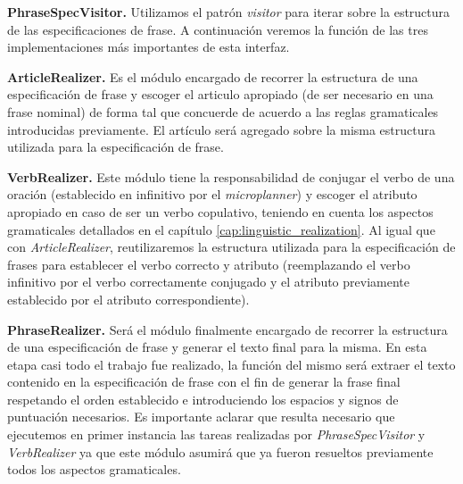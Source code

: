 \bigskip
\noindent
\textbf{PhraseSpecVisitor.} Utilizamos el patrón \textit{visitor} \cite{gof} para iterar sobre la estructura de las especificaciones de frase. A continuación veremos la función de las tres implementaciones más importantes de esta interfaz. 

\bigskip
\noindent
\textbf{ArticleRealizer.} Es el módulo encargado de recorrer la estructura de una especificación de frase y escoger el articulo apropiado (de ser necesario en una frase nominal) de forma tal que concuerde de acuerdo a las reglas gramaticales introducidas previamente. El artículo será agregado sobre la misma estructura utilizada para la especificación de frase.

\bigskip
\noindent
\textbf{VerbRealizer.} Este módulo tiene la responsabilidad de conjugar el verbo de una oración (establecido en infinitivo por el \textit{microplanner}) y escoger el atributo apropiado en caso de ser un verbo copulativo, teniendo en cuenta los aspectos gramaticales detallados en el capítulo \ref{cap:linguistic_realization}. Al igual que con \textit{ArticleRealizer}, reutilizaremos la estructura utilizada para la especificación de frases para establecer el verbo correcto y atributo (reemplazando el verbo infinitivo por el verbo correctamente conjugado y el atributo previamente establecido por el atributo correspondiente).

\bigskip
\noindent
\textbf{PhraseRealizer.} Será el módulo finalmente encargado de recorrer la estructura de una especificación de frase y generar el texto final para la misma. En esta etapa casi todo el trabajo fue realizado, la función del mismo será extraer el texto contenido en la especificación de frase con el fin de generar la frase final respetando el orden establecido e introduciendo los espacios y signos de puntuación necesarios. Es importante aclarar que resulta necesario que ejecutemos en primer instancia las tareas realizadas por \textit{PhraseSpecVisitor} y \textit{VerbRealizer} ya que este módulo asumirá que ya fueron resueltos previamente todos los aspectos gramaticales.